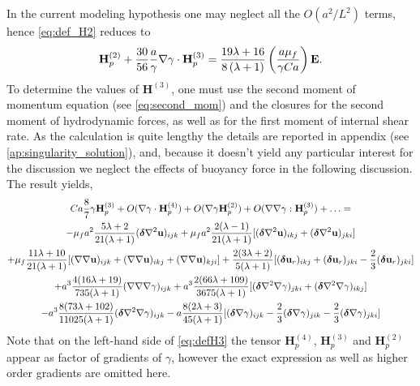 In the current modeling hypothesis one may neglect all the $O(a^2 / L^2)$  terms, hence \ref{eq:def_H2} reduces to
\begin{align}    
        \textbf{H}_p^{(2)}
        +
        \frac{30}{56}\frac{a}{\gamma}\grad\gamma\cdot \textbf{H}^{(3)}_p
        =
        \frac{19 \lambda + 16}{8 \left(\lambda + 1\right)}
        \left(\frac{a \mu_f}{\gamma Ca}\right)
        \textbf{E}. 
        \label{eq:H2_simplified}
\end{align}
To determine the values of $\textbf{H}^{(3)}$, one must use the second moment of momentum equation (see \ref{eq:second_mom}) and the closures for the second moment of hydrodynamic forces, as well as for the first moment of internal shear rate. 
As the calculation is quite lengthy the details are reported in appendix (see \ref{ap:singularity_solution}), and, because it doesn't yield any particular interest for the discussion we neglect the effects of buoyancy force in the following discussion. 
The result yields, 
\begin{multline}
    \label{eq:defH3}
    Ca \frac{8}{7} \gamma \textbf{H}_p^{(3)}
    + O(\grad\gamma\cdot \textbf{H}_p^{(4)})
    + O(\grad\gamma \textbf{H}_p^{(2)}) 
    + O(\grad\grad\gamma : \textbf{H}_p^{(3)}) + \ldots
    =\\
    - \mu_f a^2 \frac{5\lambda+2}{21(\lambda+1)} (\bm\delta \grad^2 \textbf{u})_{ijk}
    + \mu_f a^2 \frac{2(\lambda-1)}{21(\lambda+1)} [
        (\bm\delta \grad^2 \textbf{u})_{ikj}
        + (\bm\delta \grad^2 \textbf{u})_{jki}
        ]  \\
    + \mu_f \frac{11\lambda+10}{21(\lambda+1)} [(\grad\grad \textbf{u})_{ijk}+(\grad\grad \textbf{u})_{ikj}+(\grad\grad \textbf{u})_{kji}] 
    + \frac{2(3\lambda+2)}{5(\lambda+1)}[
        (\bm\delta \textbf{u}_r)_{ikj}
        +(\bm\delta \textbf{u}_r)_{jki}
        - \frac{2}{3}(\bm\delta \textbf{u}_r)_{jki}
        ] \\
    +a^3\frac{4(16\lambda + 19)}{735(\lambda +1)}(\grad\grad\grad \gamma)_{ijk}
    +a^3\frac{2(66\lambda + 109)}{3675(\lambda +1)}
    [
        (\bm\delta \grad^2\grad \gamma)_{jki}
        + (\bm\delta \grad^2\grad \gamma)_{ikj}
    ] \\
    - a^3 \frac{8(73\lambda+102)}{11025(\lambda +1)} 
    (\bm\delta \grad^2\grad \gamma)_{ijk}
    -a \frac{8(2\lambda +3)}{45(\lambda +1)}  
    [
        (\bm\delta\grad \gamma)_{ijk}
        - \frac{2}{3}(\bm\delta\grad \gamma)_{jik}
        - \frac{2}{3}(\bm\delta\grad \gamma)_{jki}
    ]
\end{multline}
Note that on the left-hand side of \ref{eq:defH3} the tensor $\textbf{H}_p^{(4)}$, $\textbf{H}_p^{(3)}$ and  $\textbf{H}_p^{(2)}$ appear as factor of gradients of $\gamma$, however the exact expression as well as higher order gradients are omitted here.

